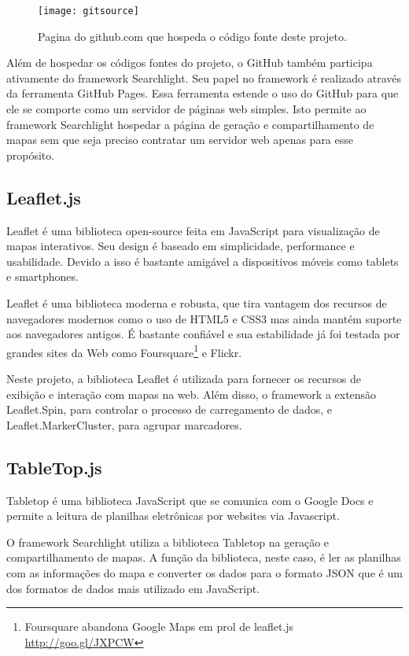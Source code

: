 	\begin{figure}[htb]
	\caption{\label{fig-gitsource}Pagina do github.com que hospeda o código fonte deste projeto.}
	\begin{center}
	    \texttt{[image: gitsource]}
	\end{center}
\end{figure}

Além de hospedar os códigos fontes do projeto, o GitHub também participa ativamente do framework Searchlight. Seu papel no framework é realizado através da ferramenta GitHub Pages. Essa ferramenta estende o uso do GitHub para que ele se comporte como um servidor de páginas web simples. Isto permite ao framework Searchlight hospedar a página de geração e compartilhamento de mapas sem que seja preciso contratar um servidor web apenas para esse propósito.


\subsection{Leaflet.js}

Leaflet é uma biblioteca open-source feita em JavaScript para visualização de mapas interativos. Seu design é baseado em simplicidade, performance e usabilidade. Devido a isso é bastante amigável a dispositivos móveis como tablets e smartphones.

Leaflet é uma biblioteca moderna e robusta, que tira vantagem dos recursos de navegadores modernos como o uso de HTML5  e CSS3 mas ainda mantém suporte aos navegadores antigos.  É bastante confiável e sua estabilidade já foi testada por grandes sites da Web como Foursquare\footnote{Foursquare abandona Google Maps em prol de leaflet.js \url{http://goo.gl/JXPCW}} e Flickr.

Neste projeto, a biblioteca Leaflet é utilizada para fornecer os recursos de exibição e interação com mapas na web.  Além disso, o framework a extensão  Leaflet.Spin, para controlar o processo de carregamento de dados, e Leaflet.MarkerCluster, para agrupar marcadores.


\subsection{TableTop.js}

Tabletop\cite{tabletop} é uma biblioteca JavaScript que se comunica com o Google Docs e permite a leitura de planilhas eletrônicas por websites via Javascript. 

O framework Searchlight utiliza a biblioteca Tabletop na geração e compartilhamento de mapas. A função da biblioteca, neste caso, é ler as planilhas com as informações do mapa e converter os dados para o formato JSON que é um dos formatos de dados mais utilizado em JavaScript.


